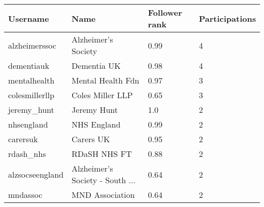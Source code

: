 \begin{tabularx}{\textwidth}{|p{2.5cm}|X|P{2.4cm}|P{2.4cm}|}
\hline
\textbf{Username} & \textbf{Name} & \textbf{Follower rank} & \textbf{Participations} \\ \hline
alzheimerssoc & Alzheimer's Society & 0.99 & 4 \\ \hline
dementiauk & Dementia UK & 0.98 & 4 \\ \hline
mentalhealth & Mental Health Fdn & 0.97 & 3 \\ \hline
colesmillerllp & Coles Miller LLP & 0.65 & 3 \\ \hline
jeremy\_hunt & Jeremy Hunt & 1.0 & 2 \\ \hline
nhsengland & NHS England & 0.99 & 2 \\ \hline
carersuk & Carers UK & 0.95 & 2 \\ \hline
rdash\_nhs & RDaSH NHS FT & 0.88 & 2 \\ \hline
alzsocseengland & Alzheimer's Society - South ... & 0.64 & 2 \\ \hline
mndassoc & MND Association & 0.64 & 2 \\ \hline
\end{tabularx}